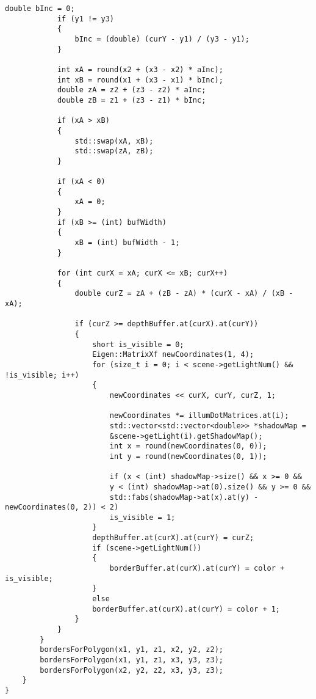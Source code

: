 \begin{center}
\begin{lstlisting}[caption=Реализация алгоритма Z-буфера]
			double bInc = 0;
			if (y1 != y3)
			{
				bInc = (double) (curY - y1) / (y3 - y1);
			}
			
			int xA = round(x2 + (x3 - x2) * aInc);
			int xB = round(x1 + (x3 - x1) * bInc);
			double zA = z2 + (z3 - z2) * aInc;
			double zB = z1 + (z3 - z1) * bInc;
			
			if (xA > xB)
			{
				std::swap(xA, xB);
				std::swap(zA, zB);
			}
			
			if (xA < 0)
			{
				xA = 0;
			}
			if (xB >= (int) bufWidth)
			{
				xB = (int) bufWidth - 1;
			}
			
			for (int curX = xA; curX <= xB; curX++)
			{
				double curZ = zA + (zB - zA) * (curX - xA) / (xB - xA);
				
				if (curZ >= depthBuffer.at(curX).at(curY))
				{
					short is_visible = 0;
					Eigen::MatrixXf newCoordinates(1, 4);
					for (size_t i = 0; i < scene->getLightNum() && !is_visible; i++)
					{
						newCoordinates << curX, curY, curZ, 1;
						
						newCoordinates *= illumDotMatrices.at(i);
						std::vector<std::vector<double>> *shadowMap =
						&scene->getLight(i).getShadowMap();
						int x = round(newCoordinates(0, 0));
						int y = round(newCoordinates(0, 1));
						
						if (x < (int) shadowMap->size() && x >= 0 &&
						y < (int) shadowMap->at(0).size() && y >= 0 &&
						std::fabs(shadowMap->at(x).at(y) - newCoordinates(0, 2)) < 2)
						is_visible = 1;
					}
					depthBuffer.at(curX).at(curY) = curZ;
					if (scene->getLightNum())
					{
						borderBuffer.at(curX).at(curY) = color + is_visible;
					}
					else
					borderBuffer.at(curX).at(curY) = color + 1;
				}
			}
		}
		bordersForPolygon(x1, y1, z1, x2, y2, z2);
		bordersForPolygon(x1, y1, z1, x3, y3, z3);
		bordersForPolygon(x2, y2, z2, x3, y3, z3);
	}
}
	\end{lstlisting}
\end{center}




